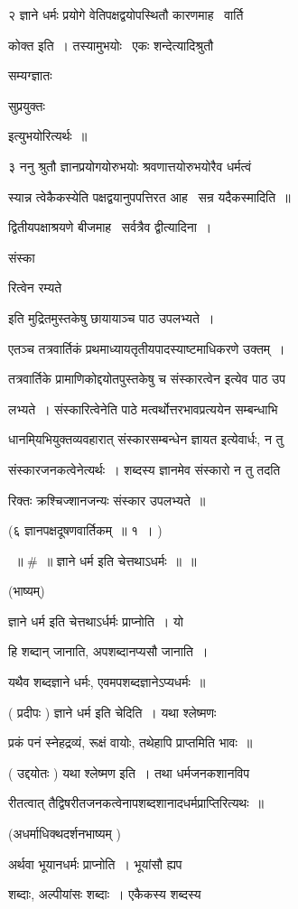 \documentclass[11pt, openany]{book}
\begin{document}
२ ज्ञाने धर्मः प्रयोगे वेतिपक्षद्वयोपस्थितौ कारणमाह \textendash\ वार्ति \textendash\ 

कोक्त इति~। तस्यामुभयोः \textendash\ एकः शन्देत्यादिश्रुतौ {\qt सम्यग्ज्ञातः 

सुप्रयुक्तः} इत्युभयोरित्यर्थः~॥ 

३ ननु श्रुतौ ज्ञानप्रयोगयोरुभयोः श्रवणात्तयोरुभयोरैव धर्मत्वं 

स्यान्न त्वेकैकस्येति पक्षद्वयानुपपत्तिरत आह \textendash\ सन्र यदैकस्मादिति~॥ 

द्वितीयपक्षाश्रयणे बीजमाह \textendash\ सर्वत्रैव द्वीत्यादिना~। {\qt संस्का \textendash\ 

रित्वेन रम्यते} इति मुद्रितमुस्तकेषु छायायाञ्च पाठ उपलभ्यते~। 

एतञ्च तत्रवार्तिकं प्रथमाध्यायतृतीयपादस्याष्टमाधिकरणे उक्तम्~। 

तत्रवार्तिके प्रामाणिकोद्दयोतपुस्तकेषु च {\qt संस्कारत्वेन} इत्येव पाठ उप \textendash\ 


लभ्यते~। संस्कारित्वेनेति पाठे मत्वर्थोत्तरभावप्रत्ययेन सम्बन्धाभि \textendash\ 

धानमि्यभियुक्तव्यवहारात् संस्कारसम्बन्धेन ज्ञायत इत्येवार्धः, न तु 

संस्कारजनकत्वेनेत्यर्थः~। शब्दस्य ज्ञानमेव संस्कारो न तु तदति \textendash\ 

रिक्तः क्रश्चिज्शानजन्यः संस्कार उपलभ्यते~॥ 





(६ ज्ञानपक्षदूषणवार्तिकम्~॥ १~। ) 

~॥ \#~॥ ज्ञाने धर्म इति चेत्तथाऽधर्मः~॥~॥ 

(भाष्यम्) 

ज्ञाने धर्म इति चेत्तथाऽर्धर्मः प्राप्नोति~। यो 

हि शब्दान् जानाति, अपशब्दानप्यसौ जानाति~। 

यथैव शब्दज्ञाने धर्मः, एवमपशब्दज्ञानेऽप्यधर्मः~॥ 

( प्रदीपः ) ज्ञाने धर्म इति चेदिति~। यथा श्लेष्मणः 

प्रकं पनं स्नेहद्रव्यं, रूक्षं वायोः, तथेहापि प्राप्तमिति भावः~॥ 

( उद्दयोतः ) यथा श्लेष्मण इति~। तथा धर्मजनकशानविप \textendash\ 

रीतत्वात् तैद्विषरीतजनकत्वेनापशब्दशानादधर्मप्राप्तिरित्यथः~॥ 

(अधर्माधिक्थदर्शनभाष्यम् ) 

अर्थवा भूयानधर्मः प्राप्नोति~। भूयांसौ ह्यप \textendash\ 

शब्दाः, अल्पीयांसः शब्दाः~। एकैकस्य शब्दस्य 
\end{document}
